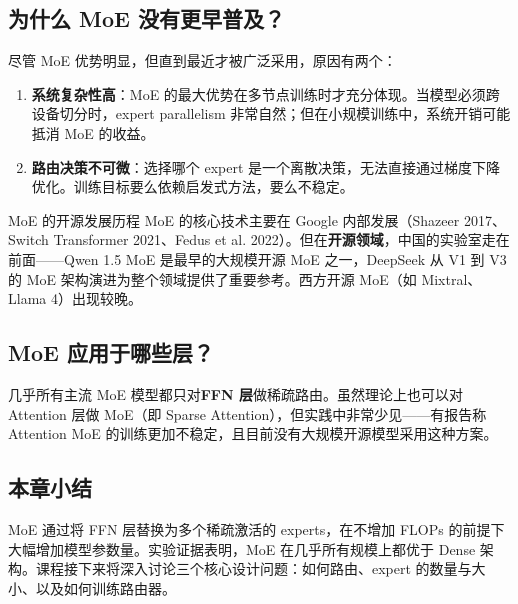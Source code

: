 \subsection{为什么 MoE 没有更早普及？}

尽管 MoE 优势明显，但直到最近才被广泛采用，原因有两个：

\begin{enumerate}
    \item \textbf{系统复杂性高}：MoE 的最大优势在多节点训练时才充分体现。当模型必须跨设备切分时，expert parallelism 非常自然；但在小规模训练中，系统开销可能抵消 MoE 的收益。
    \item \textbf{路由决策不可微}：选择哪个 expert 是一个离散决策，无法直接通过梯度下降优化。训练目标要么依赖启发式方法，要么不稳定。
\end{enumerate}

\begin{knowledgebox}{MoE 的开源发展历程}
MoE 的核心技术主要在 Google 内部发展（Shazeer 2017、Switch Transformer 2021、Fedus et al. 2022）。但在\textbf{开源领域}，中国的实验室走在前面——Qwen 1.5 MoE 是最早的大规模开源 MoE 之一，DeepSeek 从 V1 到 V3 的 MoE 架构演进为整个领域提供了重要参考。西方开源 MoE（如 Mixtral、Llama 4）出现较晚。
\end{knowledgebox}

\subsection{MoE 应用于哪些层？}

几乎所有主流 MoE 模型都只对\textbf{FFN 层}做稀疏路由。虽然理论上也可以对 Attention 层做 MoE（即 Sparse Attention），但实践中非常少见——有报告称 Attention MoE 的训练更加不稳定，且目前没有大规模开源模型采用这种方案。

\subsection{本章小结}

MoE 通过将 FFN 层替换为多个稀疏激活的 experts，在不增加 FLOPs 的前提下大幅增加模型参数量。实验证据表明，MoE 在几乎所有规模上都优于 Dense 架构。课程接下来将深入讨论三个核心设计问题：如何路由、expert 的数量与大小、以及如何训练路由器。


